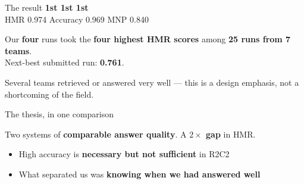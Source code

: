 \documentclass[aspectratio=169,11pt]{beamer}
\newcommand{\HMR}{\textsc{HMR}}
\newcommand{\MNP}{\textsc{MNP}}
\newcommand{\hl}[1]{{\color{accent}\textbf{#1}}}
\newcommand{\gd}[1]{{\color{good}\textbf{#1}}}
\begin{document}
\begin{frame}{The result}
\centering
\vspace{0.5em}
{\fontsize{34}{40}\selectfont\bfseries\color{ink}
1st \quad 1st \quad 1st}\\[0.4em]
{\large \HMR{} 0.974 \qquad Accuracy 0.969 \qquad \MNP{} 0.840}

\vspace{1.2em}
\begin{block}{}
\centering\large
Our \textbf{four} runs took the \textbf{four highest \HMR{} scores} among
\textbf{25 runs from 7 teams}.\\[0.3em]
Next-best submitted run: \textbf{0.761}.
\end{block}

\vspace{0.5em}
{\small Several teams retrieved or answered very well --- this is a design emphasis,
not a shortcoming of the field.}
\end{frame}

\begin{frame}{The thesis, in one comparison}
\centering
\vspace{0.3em}

\vspace{1.0em}
{\large Two systems of \textbf{comparable answer quality}. A \hl{$2\times$ gap} in \HMR.}

\vspace{0.8em}
\begin{itemize}
  \item High accuracy is \textbf{necessary but not sufficient} in R2C2
  \item What separated us was \textbf{knowing when we had answered well}
\end{itemize}
\end{frame}
\end{document}
